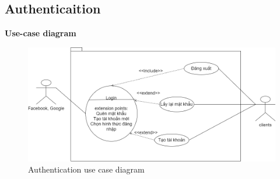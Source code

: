 \subsection{Authenticaition}

\textbf{Use-case diagram}
    \begin{center}
        \begin{figure}[!h]
            \begin{center}
                \includegraphics[scale=0.4]{Images/authentication.png} 
            \end{center} 
            \vspace{1cm}
            \caption{Authentication use case diagram}
        \end{figure}    
    \end{center}

